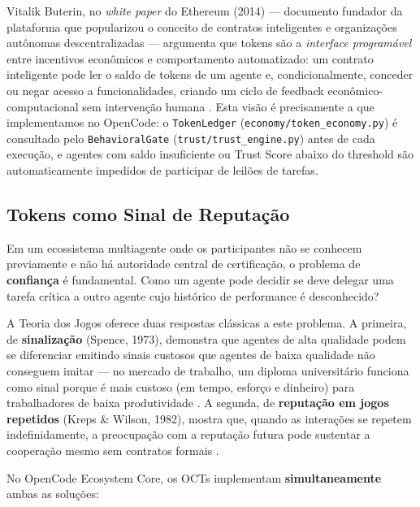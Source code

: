 Vitalik Buterin, no \textit{white paper} do Ethereum (2014) --- documento fundador da plataforma que popularizou o conceito de contratos inteligentes e organizações autônomas descentralizadas --- argumenta que tokens são a \textit{interface programável} entre incentivos econômicos e comportamento automatizado: um contrato inteligente pode ler o saldo de tokens de um agente e, condicionalmente, conceder ou negar acesso a funcionalidades, criando um ciclo de feedback econômico-computacional sem intervenção humana \cite{buterin2014ethereum}. Esta visão é precisamente a que implementamos no OpenCode: o \texttt{TokenLedger} (\texttt{economy/token\_economy.py}) é consultado pelo \texttt{BehavioralGate} (\texttt{trust/trust\_engine.py}) antes de cada execução, e agentes com saldo insuficiente ou Trust Score abaixo do threshold são automaticamente impedidos de participar de leilões de tarefas.

\subsection{Tokens como Sinal de Reputação}

Em um ecossistema multiagente onde os participantes não se conhecem previamente e não há autoridade central de certificação, o problema de \textbf{confiança} é fundamental. Como um agente pode decidir se deve delegar uma tarefa crítica a outro agente cujo histórico de performance é desconhecido?

A Teoria dos Jogos oferece duas respostas clássicas a este problema. A primeira, de \textbf{sinalização} (Spence, 1973), demonstra que agentes de alta qualidade podem se diferenciar emitindo sinais custosos que agentes de baixa qualidade não conseguem imitar --- no mercado de trabalho, um diploma universitário funciona como sinal porque é mais custoso (em tempo, esforço e dinheiro) para trabalhadores de baixa produtividade \cite{spence1973job}. A segunda, de \textbf{reputação em jogos repetidos} (Kreps \& Wilson, 1982), mostra que, quando as interações se repetem indefinidamente, a preocupação com a reputação futura pode sustentar a cooperação mesmo sem contratos formais \cite{kreps1982reputation}.

No OpenCode Ecosystem Core, os OCTs implementam \textbf{simultaneamente} ambas as soluções:

